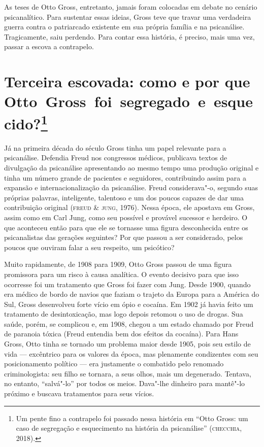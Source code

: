 As teses de Otto Gross, entretanto, jamais foram colocadas em debate no
cenário psicanalítico. Para sustentar essas ideias, Gross teve que
travar uma verdadeira guerra contra o patriarcado existente em sua
própria família e na psicanálise. Tragicamente, saiu perdendo. Para
contar essa história, é preciso, mais uma vez, passar a escova a
contrapelo.

\section{Terceira escovada: como e por que Otto~Gross~foi~segregado~e~esquecido?\protect\footnote{\uppercase{U}m pente fino a contrapelo foi passado nessa
  história em ``\uppercase{O}tto \uppercase{G}ross: um caso de segregação e esquecimento na
  história da psicanálise'' (\textsc{checchia}, 2018).}}

Já na primeira década do século  Gross tinha um papel relevante para a
psicanálise. Defendia Freud nos congressos médicos, publicava textos de
divulgação da psicanálise apresentando ao mesmo tempo uma produção
original e tinha um número grande de pacientes e seguidores,
contribuindo assim para a expansão e internacionalização da psicanálise.
Freud considerava"-o, segundo suas próprias palavras, inteligente,
talentoso e um dos poucos capazes de dar uma contribuição original (\textsc{freud} \& \textsc{jung}, 1976).
Nessa época, ele apostava em Gross, assim como em Carl Jung, como seu
possível e provável sucessor e herdeiro. O que aconteceu então para que
ele se tornasse uma figura desconhecida entre os psicanalistas das
gerações seguintes? Por que passou a ser considerado, pelos poucos que
ouviram falar a seu respeito, um psicótico?

Muito rapidamente, de 1908 para 1909, Otto Gross passou de uma figura
promissora para um risco à causa analítica. O evento decisivo para que
isso ocorresse foi um tratamento que Gross foi fazer com Jung. Desde
1900, quando era médico de bordo de navios que faziam o trajeto da
Europa para a América do Sul, Gross desenvolveu forte vício em ópio e
cocaína. Em 1902 já havia feito um tratamento de desintoxicação, mas
logo depois retomou o uso de drogas. Sua saúde, porém, se complicou e,
em 1908, chegou a um estado chamado por Freud de paranoia tóxica (Freud
entendia bem dos efeitos da cocaína). Para Hans Gross, Otto tinha se
tornado um problema maior desde 1905, pois seu estilo de vida ---
excêntrico para os valores da época, mas plenamente condizentes com seu
posicionamento político --- era justamente o combatido pelo renomado
criminologista: seu filho se tornara, a seus olhos, mais um degenerado.
Tentava, no entanto, ``salvá"-lo'' por todos os meios. Dava"-lhe dinheiro
para mantê"-lo próximo e buscava tratamentos para seus vícios.

